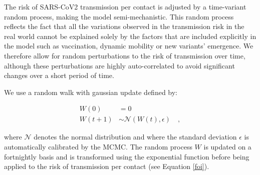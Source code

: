The risk of SARS-CoV2 transmission per contact is adjusted by a time-variant random process, making
the model semi-mechanistic. This random process reflects the fact that all the variations observed in the transmission
risk in the real world cannot be explained solely by the factors that are included explicitly in the model such as vaccination, dynamic mobility or new variants' emergence.
We therefore allow for random perturbations to the risk of transmission over time, although these perturbations are highly auto-correlated
to avoid significant changes over a short period of time.

We use a random walk with gaussian update defined by:

\begin{equation}
    \label{eq:random_process}
    \begin{split}
    W(0) & = 0 \\
    W(t+1) & \sim \mathcal{N}(W(t), \epsilon) \quad ,
    \end{split}
\end{equation}

where $\mathcal{N}$ denotes the normal distribution and where the standard deviation $\epsilon$ is automatically calibrated by the MCMC.
The random process $W$ is updated on a fortnightly basis and is transformed using the exponential function before being applied to the risk of transmission per contact (see Equation \ref{foi}).